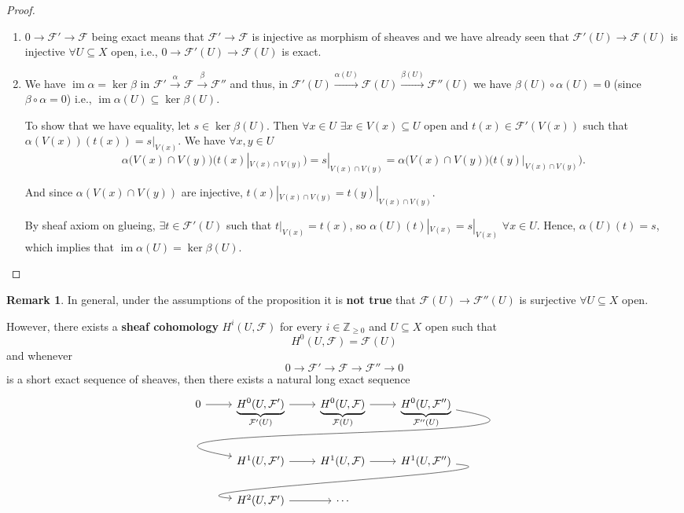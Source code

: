 \documentclass[12pt]{article}
\DeclareMathOperator{\im}{im}
\theoremstyle{definition}
\newtheorem*{remark}{Remark}
\theoremstyle{remark}
\begin{document}
\begin{proof}
\begin{enumerate}[label=\arabic*)]
\item $0\rightarrow\mathcal{F}'\rightarrow\mathcal{F}$ being exact means that $\mathcal{F}'\rightarrow\mathcal{F}$ is injective as morphism of sheaves and we have already seen that $\mathcal{F}'(U)\rightarrow\mathcal{F}(U)$ is injective $\forall U\subseteq X$ open, i.e., $0\rightarrow\mathcal{F}'(U)\rightarrow\mathcal{F}(U)$ is exact.

\item We have $\im\alpha=\ker\beta$ in $\mathcal{F}'\xrightarrow{\alpha}\mathcal{F}\xrightarrow{\beta}\mathcal{F}''$ and thus, in $\mathcal{F}'(U)\xrightarrow{\alpha(U)}\mathcal{F}(U)\xrightarrow{\beta(U)}\mathcal{F}''(U)$ we have $\beta(U)\circ\alpha(U)=0$ (since $\beta\circ\alpha=0$) i.e., $\im\alpha(U)\subseteq\ker\beta(U)$.

To show that we have equality, let $s\in\ker\beta(U)$. Then $\forall x\in U$ $\exists x\in V(x)\subseteq U$ open and $t(x)\in\mathcal{F}'(V(x))$ such that $\alpha(V(x))(t(x))=s|_{V(x)}$. We have $\forall x,y\in U$
\[\alpha\big(V(x)\cap V(y)\big)\big(t(x)|_{V(x)\cap V(y)}\big)=s|_{V(x)\cap V(y)}=\alpha\big(V(x)\cap V(y)\big)\big(t(y)|_{V(x)\cap V(y)}\big).\]

And since $\alpha(V(x)\cap V(y))$ are injective, $t(x)|_{V(x)\cap V(y)}=t(y)|_{V(x)\cap V(y)}$.

By sheaf axiom on glueing, $\exists t\in\mathcal{F}'(U)$ such that $t|_{V(x)}=t(x)$, so $\alpha(U)(t)|_{V(x)}=s|_{V(x)}$ $\forall x\in U$. Hence, $\alpha(U)(t)=s$, which implies that $\im\alpha(U)=\ker\beta(U)$.
\end{enumerate}
\end{proof}

\begin{remark}
In general, under the assumptions of the proposition it is \textbf{not true} that $\mathcal{F}(U)\rightarrow\mathcal{F}''(U)$ is surjective $\forall U\subseteq X$ open.

However, there exists a \textbf{sheaf cohomology} $H^i(U,\mathcal{F})$ for every $i\in\mathbb{Z}_{\geq0}$ and $U\subseteq X$ open such that
\[H^0(U,\mathcal{F})=\mathcal{F}(U)\]
and whenever
\[0\longrightarrow\mathcal{F}'\longrightarrow\mathcal{F}\longrightarrow\mathcal{F}''\longrightarrow0\]
is a short exact sequence of sheaves, then there exists a natural long exact sequence
\[
\begin{tikzcd}
0\arrow[r]&\underbrace{H^0(U,\mathcal{F}')}_{\mathcal{F}'(U)}\arrow[r]&\underbrace{H^0(U,\mathcal{F})}_{\mathcal{F}(U)}\arrow[r]&\underbrace{H^0(U,\mathcal{F}'')}_{\mathcal{F}''(U)}\arrow[out=350,in=170,looseness=2,lld]\\
&H^1(U,\mathcal{F}')\arrow[r]&H^1(U,\mathcal{F})\arrow[r]&H^1(U,\mathcal{F}'')\arrow[out=355,in=175, looseness=1,overlay,lld]\\
&H^2(U,\mathcal{F}')\arrow[r]&\cdots
\end{tikzcd}
\]
\end{remark}
\end{document}

